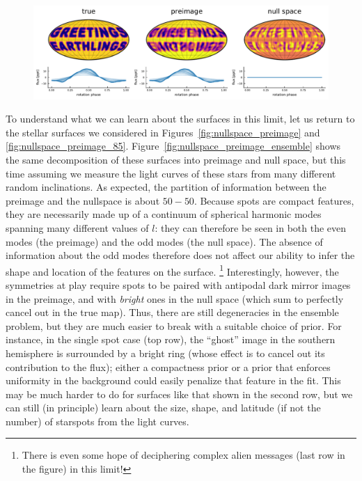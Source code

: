 \documentclass[modern]{aastex62}
\begin{document}
\begin{figure}[p!]
\begin{centering}
        \\[1em]
        \includegraphics[width=\linewidth]{figures/nullspace_preimage_d.pdf}
    \end{centering}
\end{figure}

To understand what we can learn about the surfaces in this limit, let us
return to the stellar surfaces we considered in Figures~\ref{fig:nullspace_preimage}
and \ref{fig:nullspace_preimage_85}.
Figure~\ref{fig:nullspace_preimage_ensemble} shows the same decomposition of
these surfaces into preimage and null space, but this time assuming we measure
the light curves of these stars from many different random inclinations.
As expected, the partition of information between the preimage and the nullspace
is about $50{-}50$.
Because spots are compact features, they
are necessarily made up of a continuum of spherical harmonic modes spanning
many different values of $l$: they can therefore be seen in both the even
modes (the preimage) and the odd modes (the null space). The absence of
information about the odd modes therefore does not affect our ability to
infer the shape and location of the features on the surface.%
\footnote{
    There is even some hope of deciphering complex alien messages
    (last row in the figure) in this limit!
}
Interestingly, however,
the symmetries at play require spots to be paired with antipodal dark mirror
images in the preimage, and with \emph{bright} ones in the null space
(which sum to perfectly cancel out in the true map). Thus, there are still
degeneracies in the ensemble problem, but they are much easier to break
with a suitable choice of prior. For instance, in the single spot case
(top row), the ``ghost'' image in the southern hemisphere is surrounded by
a bright ring (whose effect is to cancel out its contribution to the flux);
either a compactness prior or a prior that enforces uniformity in the
background could easily penalize that feature in the fit. This may be
much harder to do for surfaces like that shown in the second row, but
we can still (in principle) learn about the size, shape, and latitude
(if not the number) of starspots from the light curves.
\end{document}
